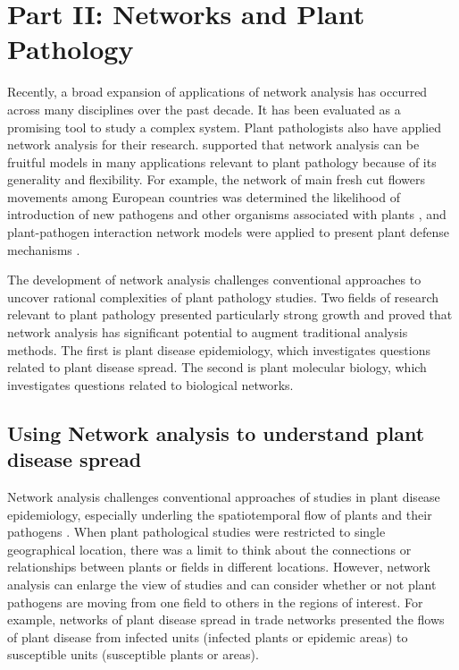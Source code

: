 \section*{Part II: Networks and Plant Pathology}

Recently, a broad expansion of applications of network analysis has occurred across many disciplines over the past decade. It has been evaluated as a promising tool to study a complex system. Plant pathologists also have applied network analysis for their research.  supported that network analysis can be fruitful models in many applications relevant to plant pathology because of its generality and flexibility. For example, the network of main fresh cut flowers movements among European countries was determined the likelihood of introduction of new pathogens and other organisms associated with plants , and plant-pathogen interaction network models were applied to present plant defense mechanisms .


The development of network analysis challenges conventional approaches to uncover rational complexities of plant pathology studies. Two fields of research relevant to plant pathology presented particularly strong growth and proved that network analysis has significant potential to augment traditional analysis methods. The first is plant disease epidemiology, which investigates questions related to plant disease spread. The second is plant molecular biology, which investigates questions related to biological networks.


\subsection*{Using Network analysis to understand plant disease spread}
Network analysis challenges conventional approaches of studies in plant disease epidemiology, especially underling the spatiotemporal flow of plants and their pathogens \cite{Moslonka2010}. When plant pathological studies were restricted to single geographical location, there was a limit to think about the connections or relationships between plants or fields in different locations. However, network analysis can enlarge the view of studies and can consider whether or not plant pathogens are moving from one field to others in the regions of interest. For example, networks of plant disease spread in trade networks presented the flows of plant disease from infected units (infected plants or epidemic areas) to susceptible units (susceptible plants or areas).

